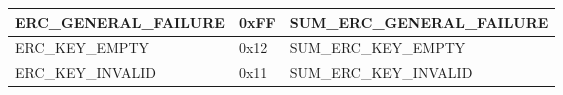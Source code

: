 \begin{longtable}{|l|l|l|}
\begin{minipage}{0.38\linewidth}\raggedright\vspace{.75ex}ERC\_GENERAL\_FAILURE\vspace{.75ex}\end{minipage} & \begin{minipage}{0.15\linewidth}\raggedright\vspace{.75ex}0xFF\vspace{.75ex}\end{minipage} & \begin{minipage}{0.38\linewidth}\raggedright\vspace{.75ex}SUM\_ERC\_GENERAL\_FAILURE\vspace{.75ex}\end{minipage}\\\hline
\begin{minipage}{0.38\linewidth}\raggedright\vspace{.75ex}ERC\_KEY\_EMPTY\vspace{.75ex}\end{minipage} & \begin{minipage}{0.15\linewidth}\raggedright\vspace{.75ex}0x12\vspace{.75ex}\end{minipage} & \begin{minipage}{0.38\linewidth}\raggedright\vspace{.75ex}SUM\_ERC\_KEY\_EMPTY\vspace{.75ex}\end{minipage}\\\hline
\begin{minipage}{0.38\linewidth}\raggedright\vspace{.75ex}ERC\_KEY\_INVALID\vspace{.75ex}\end{minipage} & \begin{minipage}{0.15\linewidth}\raggedright\vspace{.75ex}0x11\vspace{.75ex}\end{minipage} & \begin{minipage}{0.38\linewidth}\raggedright\vspace{.75ex}SUM\_ERC\_KEY\_INVALID\vspace{.75ex}\end{minipage}\\\hline

\end{longtable}
